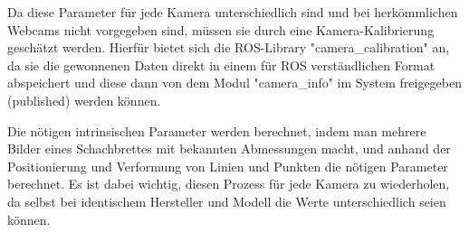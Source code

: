 \documentclass[12pt, ngerman]{article}
\begin{document}
Da diese Parameter für jede Kamera unterschiedlich sind und bei herkömmlichen Webcams nicht vorgegeben sind, müssen sie durch eine Kamera-Kalibrierung geschätzt werden. Hierfür bietet sich die ROS-Library "camera\_calibration" an, da sie die gewonnenen Daten direkt in einem für ROS verständlichen Format abspeichert und diese dann von dem Modul "camera\_info" im System freigegeben (published) werden können.

Die nötigen intrinsischen Parameter werden berechnet, indem man mehrere Bilder eines Schachbrettes mit bekannten Abmessungen macht, und anhand der Positionierung und Verformung von Linien und Punkten die nötigen Parameter berechnet. Es ist dabei wichtig, diesen Prozess für jede Kamera zu wiederholen, da selbst bei identischem Hersteller und Modell die Werte unterschiedlich seien können.
\end{document}
